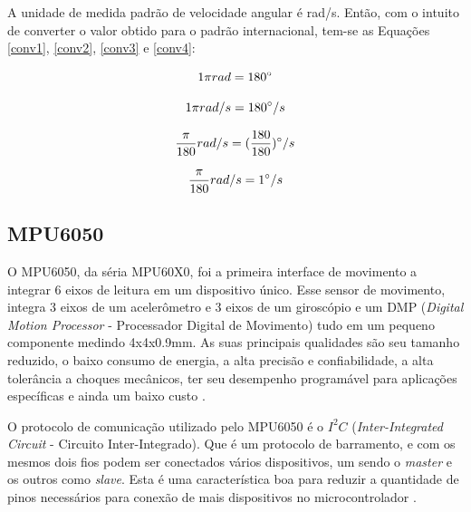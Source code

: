 			A unidade de medida padrão de velocidade angular  é rad/s. Então, com o intuito de converter o valor obtido para o padrão internacional, tem-se as Equações \ref{conv1}, \ref{conv2}, \ref{conv3} e \ref{conv4}:
			
			\begin{equation}
			1 \pi rad = 180\degree
			\label{conv1}
			\end{equation}
			
			\begin{equation}
			1 \pi rad /s = 180\degree/s 
			\label{conv2}
			\end{equation}
			
			\begin{equation}
			 \frac{\pi}{180} rad /s = (\frac{180}{180})\degree/s 
			\label{conv3}
			\end{equation}
			
			\begin{equation}
			\frac{\pi}{180} rad /s = 1\degree/s 
			\label{conv4}
			\end{equation}


\subsection{MPU6050}
	
	O MPU6050, da séria MPU60X0, foi a primeira interface de movimento a integrar 6 eixos de leitura em um dispositivo único. Esse sensor de movimento, integra 3 eixos de um acelerômetro e 3 eixos de um giroscópio e um DMP (\textit{Digital Motion Processor} - Processador Digital de Movimento) tudo em um pequeno componente medindo 4x4x0.9mm. As suas principais qualidades são seu tamanho reduzido, o baixo consumo de energia, a alta precisão e confiabilidade, a alta tolerância a choques mecânicos, ter seu desempenho programável para aplicações específicas e ainda um baixo custo \cite{mpu6050}.
	
	O protocolo de comunicação utilizado pelo MPU6050 é o $I^2C$ (\textit{Inter-Integrated Circuit} - Circuito Inter-Integrado). Que é um protocolo de barramento, e com os mesmos dois fios podem ser conectados vários dispositivos, um sendo o \textit{master} e os outros como \textit{slave}. Esta é uma característica boa para reduzir a quantidade de pinos necessários para conexão de mais dispositivos no microcontrolador \cite{mpu6050}.
	
